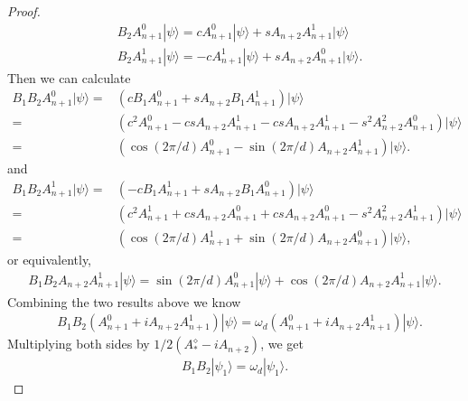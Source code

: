 \documentclass[11pt,letterpaper]{article}
\newcommand{\ket}[1]{|#1\rangle}
\newcommand{\1}{\mathbb{1}}
\theoremstyle{definition}
\begin{document}
\begin{proof}
\begin{align}
        		&B_2A_{n+1}^0 \ket{\psi} = cA_{n+1}^0\ket{\psi} + sA_{n+2}A_{n+1}^1\ket{\psi}\\
        		&B_2A_{n+1}^1 \ket{\psi} = -cA_{n+1}^1\ket{\psi} + sA_{n+2}A_{n+1}^0\ket{\psi}.
        \end{align}
        Then we can calculate
        \begin{align}
        		B_1B_2 A_{n+1}^0 \ket{\psi} =& (c B_1A_{n+1}^0 +sA_{n+2}B_1A_{n+1}^1)\ket{\psi}\\
        		=&(c^2A_{n+1}^0- csA_{n+2}A_{n+1}^1 -csA_{n+2}A_{n+1}^1 -s^2 A_{n+2}^2 A_{n+1}^0)\ket{\psi}\\
        		=& (\cos(2\pi/d) A_{n+1}^0 - \sin(2\pi/d) A_{n+2}A_{n+1}^1)\ket{\psi}.
        \end{align}
        and 
        \begin{align}
        		B_1B_2 A_{n+1}^1 \ket{\psi} =& (-c B_1A_{n+1}^1 +sA_{n+2}B_1A_{n+1}^0)\ket{\psi}\\
        		=&(c^2A_{n+1}^1+ csA_{n+2}A_{n+1}^0 +csA_{n+2}A_{n+1}^0 -s^2 A_{n+2}^2 A_{n+1}^1)\ket{\psi}\\
        		=& (\cos(2\pi/d) A_{n+1}^1 + \sin(2\pi/d) A_{n+2}A_{n+1}^0)\ket{\psi},
        \end{align}
        or equivalently,
        \begin{align}
        		B_1B_2 A_{n+2}A_{n+1}^1 \ket{\psi} = \sin(2\pi/d) A_{n+1}^0\ket{\psi} + \cos(2\pi/d)A_{n+2}A_{n+1}^1\ket{\psi}.
        \end{align}
        Combining the two results above we know
	\begin{align}
		\label{eq:omegad}&B_1B_2 (A_{n+1}^0 + i A_{n+2}A_{n+1}^1) \ket{\psi} =\omega_d(A_{n+1}^0 + iA_{n+2}A_{n+1}^1) \ket{\psi}.
	\end{align}
	Multiplying both sides by $1/2(A_\ast^\diamond - iA_{n+2})$, we get
	\begin{align}
		B_1B_2 \ket{\psi_1} = \omega_d\ket{\psi_1}.
	\end{align}
	

\end{proof}
\end{document}
